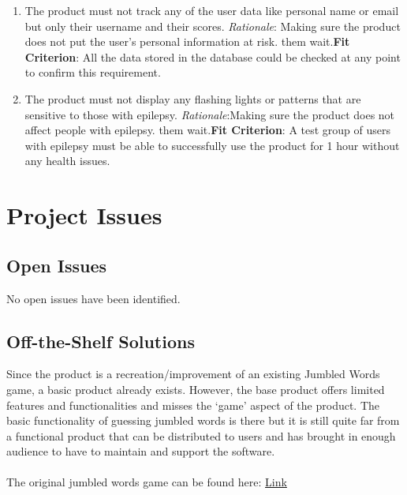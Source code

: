 \documentclass[12pt, titlepage]{article}
\begin{document}
\begin{enumerate}[{NFR9}.1]
	\item  The product must not track any of the user data like personal name or email but only their username and their scores.
	\newline \emph{Rationale}: Making sure the product does not put the user’s personal information at risk.
	them wait.\newline \textbf{Fit Criterion}: All the data stored in the database could be checked at any point to confirm this requirement.
	
	\item The product must not display any flashing lights or patterns that are sensitive to those with epilepsy. 
	\newline \emph{Rationale}:Making sure the product does not affect people with epilepsy.
	them wait.\newline \textbf{Fit Criterion}: A test group of users with epilepsy must be able to successfully use the product for 1 hour without any health issues.
\end{enumerate}

\section{Project Issues}

\subsection{Open Issues}

No open issues have been identified.

\subsection{Off-the-Shelf Solutions}

Since the product is a recreation/improvement of an existing Jumbled Words game, a basic product already exists. However, the base product offers limited features and functionalities and misses the ‘game’ aspect of the product. The basic functionality of guessing jumbled words is there but it is still quite far from a functional product that can be distributed to users and has brought in enough audience to have to maintain and support the software.\\
\\
The original jumbled words game can be found here: \href{https://code-projects.org/jumbled-words-quiz-in-python-with-source-code/}{Link}
\end{document}
